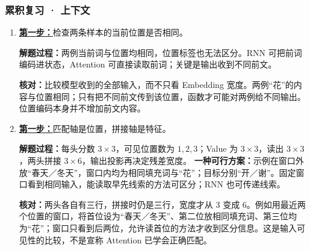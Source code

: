 \subsubsection*{累积复习 · 上下文}
\begin{enumerate}[label={},leftmargin=4.8em,itemsep=4pt]
\item[\textbf{R-07.}] \leavevmode{}\label{solution:R-07}\label{solution:review-context-evidence}\hyperref[exercise:review-context-evidence]{\textbf{第一步：}}检查两条样本的当前位置是否相同。\par\nobreak\textbf{解题过程：}两例当前词与位置均相同，位置标签也无法区分。RNN 可把前词编码进状态，Attention 可直接读取前词；关键是输出收到不同前文。\par\textbf{核对：}比较模型收到的全部输入，而不只看 Embedding 宽度。两例“花”的内容与位置相同；只有把不同前文传到该位置，函数才可能对两例给不同输出。位置编码本身并不增加前文内容。
\item[\textbf{R-08.}] \leavevmode{}\label{solution:R-08}\label{solution:review-multihead-shapes}\hyperref[exercise:review-multihead-shapes]{\textbf{第一步：}}匹配轴是位置，拼接轴是特征。\par\nobreak\textbf{解题过程：}每头分数 $3\times3$，可见位置数为 $1,2,3$；Value 为 $3\times3$，读出 $3\times3$，两头拼接 $3\times6$，输出投影再决定残差宽度。
\textbf{一种可行方案：}示例在窗口外放“春天／冬天”，窗口内均为相同填充词与“花”；目标分别“开／谢”。固定窗口看到相同输入，能读取早先线索的方法可区分；RNN 也可传递线索。\par\textbf{核对：}两头各自有三行，拼接时仍是三行，宽度才从 $3$ 变成 $6$。例如用最近两个位置的窗口，将首位设为“春天／冬天”、第二位放相同填充词、第三位均为“花”；窗口只看到后两位，允许读首位的方法才收到区分信息。这是输入可见性的比较，不是宣称 Attention 已学会正确匹配。
\end{enumerate}

